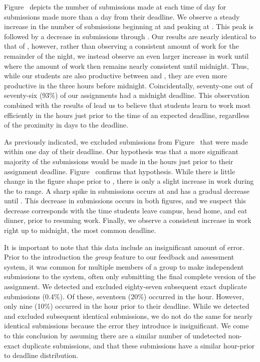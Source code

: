 Figure~ depicts the number of submissions made at
each time of day for submissions made more than a day from their deadline. We
observe a steady increase in the number of submissions beginning at  and
peaking at . This peak is followed by a decrease in submissions through
. Our results are nearly identical to that of \spacco{}, however, rather
than observing a consistent amount of work for the remainder of the night, we
instead observe an even larger increase in work until  where the amount
of work then remains nearly consistent until midnight. Thus, while our students
are also productive between  and , they are even more productive in
the three hours before midnight. Coincidentally, seventy-one out of seventy-six
(93\%) of our assignments had a midnight deadline. This observation combined
with the results of \spacco{} lead us to believe that students learn to work
most efficiently in the hours just prior to the time of an expected deadline,
regardless of the proximity in days to the deadline.

As previously indicated, we excluded submissions from
Figure~ that were made within one day of their
deadline. Our hypothesis was that a more significant majority of the
submissions would be made in the hours just prior to their assignment
deadline. Figure~ confirms that hypothesis. While
there is little change in the figure shape prior to , there is only a
slight increase in work during the  to  range. A sharp spike in
submissions occurs at  and has a gradual decrease until . This
decrease in submissions occurs in both figures, and we suspect this decrease
corresponds with the time students leave campus, head home, and eat dinner,
prior to resuming work. Finally, we observe a consistent increase in work right
up to midnight, the most common deadline.

It is important to note that this data include an insignificant amount of
error. Prior to the introduction the \emph{group} feature to our feedback and
assessment system, it was common for multiple members of a group to make
independent submissions to the system, often only submitting the final complete
version of the assignment. We detected and excluded eighty-seven subsequent
exact duplicate submissions (0.4\%). Of these, seventeen (20\%) occurred in the
 hour. However, only nine (10\%) occurred in the hour prior to their
deadline. While we detected and excluded subsequent identical submissions, we
do not do the same for nearly identical submissions because the error they
introduce is insignificant. We come to this conclusion by assuming there are a
similar number of undetected non-exact duplicate submissions, and that these
submissions have a similar hour-prior to deadline distribution.

